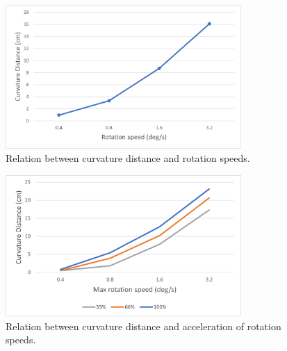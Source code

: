 \begin{figure}[H]\centering
	\includegraphics[width=0.8\textwidth]{Pictures/Curvature distance for four constant speeds.png}%
	\caption{Relation between curvature distance and rotation speeds.}\label{fig:Curvature distance for four constant speeds}%
	
\end{figure}


\begin{figure}[H]\centering
	\includegraphics[width=0.8\textwidth]{Pictures/Curvature distance for three accelerations at each constant speed.png}%
	\caption{Relation between curvature distance and acceleration of rotation speeds.}\label{fig:Curvature distance for three accelerations at each constant speed}%
	
\end{figure}


